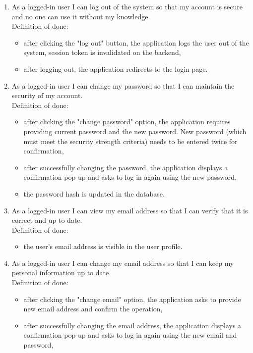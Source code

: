 \begin{enumerate}
	\item As a logged-in user I can log out of the system so that my account is secure and no one can use it without my knowledge.
	\\Definition of done:
	\begin{itemize}
		\item after clicking the "log out" button, the application logs the user out of the system, session token is invalidated on the backend,
		\item after logging out, the application redirects to the login page.
	\end{itemize}
	\item As a logged-in user I can change my password so that I can maintain the security of my account.
	\\Definition of done:
	\begin{itemize}
		\item after clicking the "change password" option, the application requires providing current password and the new password. New password (which must meet the security strength criteria) needs to be entered twice for confirmation,
		\item after successfully changing the password, the application displays a confirmation pop-up and asks to log in again using the new password,
		\item the password hash is updated in the database.
	\end{itemize}
	\item As a logged-in user I can view my email address so that I can verify that it is correct and up to date.
	\\Definition of done:
	\begin{itemize}
		\item the user's email address is visible in the user profile.
	\end{itemize}
	\item As a logged-in user I can change my email address so that I can keep my personal information up to date.
	\\Definition of done:
	\begin{itemize}
		\item after clicking the "change email" option, the application asks to provide new email address and confirm the operation,
		\item after successfully changing the email address, the application displays a confirmation pop-up and asks to log in again using the new email and password,

\end{itemize}
\end{enumerate}
